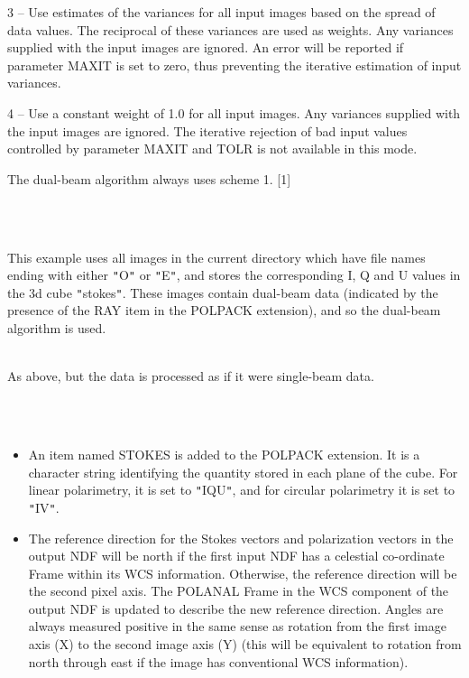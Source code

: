 \documentclass[twoside,11pt]{article}
\renewcommand{\_}{\texttt{\symbol{95}}}
\newlength{\sstexampleslength}
\newcommand{\sstexamples}[1]{
   \item[Examples:] \mbox{} \\
   \vspace{-3.5ex}
   \begin{description}
      #1
   \end{description}
}
\newcommand{\sstexamplesubsection}[2]{\sloppy
\item[\parbox{\sstexampleslength}{\ssttt #1}] \mbox{} \vspace{1.0ex}
\\ #2 }
\newcommand{\sstnotes}[1]{\item[Notes:] \mbox{} \\[1.3ex] #1}
\newcommand{\sstitemlist}[1]{
  \mbox{} \\
  \vspace{-3.5ex}
  \begin{itemize}
     #1
  \end{itemize}
}
\newcommand{\sstitem}{\item}
\newcommand{\sstexamples}[1]{
      \item[Examples:] \\
      \begin{description}
         #1
      \end{description}
      \\
   }
\newcommand{\sstexamplesubsection}[2]{\item[{\ssttt #1}] #2}
\newcommand{\sstnotes}[1]{\item[Notes:] #1 }
\newcommand{\sstitemlist}[1]{
      \begin{itemize}
         #1
      \end{itemize}
      \\
   }
\newcommand{\sstitem}{\item}
\begin{document}
{{{{            \sstitem
            3 -- Use estimates of the variances for all input images based
            on the spread of data values. The reciprocal of these variances
            are used as weights. Any variances supplied with the input images
            are ignored. An error will be reported if parameter MAXIT is set to
            zero, thus preventing the iterative estimation of input variances.

            \sstitem
            4 -- Use a constant weight of 1.0 for all input images. Any
            variances supplied with the input images are ignored. The
            iterative rejection of bad input values controlled by parameter
            MAXIT and TOLR is not available in this mode.

         }
         The dual-beam algorithm always uses scheme 1. [1]
      }
   }
   \sstexamples{
      \sstexamplesubsection{
         polcal {\tt "}$*$\_O,$*$\_E{\tt "} stokes
      }{
         This example uses all images in the current directory which have
         file names ending with either {\tt "}\_O{\tt "} or {\tt "}\_E{\tt "}, and stores the
         corresponding I, Q and U values in the 3d cube {\tt "}stokes{\tt "}. These
         images contain dual-beam data (indicated by the presence of the
         RAY item in the POLPACK extension), and so the dual-beam
         algorithm is used.
      }
      \sstexamplesubsection{
         polcal {\tt "}$*$\_O,$*$\_E{\tt "} stokes nodualbeam
      }{
         As above, but the data is processed as if it were single-beam data.
      }
   }
   \sstnotes{
      \sstitemlist{

         \sstitem
         An item named STOKES is added to the POLPACK extension. It is a
         character string identifying the quantity stored in each plane of
         the cube. For linear polarimetry, it is set to {\tt "}IQU{\tt "}, and for
         circular polarimetry it is set to {\tt "}IV{\tt "}.

         \sstitem
         The reference direction for the Stokes vectors and polarization
         vectors in the output NDF will be north if the first input NDF
         has a celestial co-ordinate Frame within its WCS information. Otherwise,
         the reference direction will be the second pixel axis. The POLANAL
         Frame in the WCS component of the output NDF is updated to describe
         the new reference direction. Angles are always measured positive in the
         same sense as rotation from the first image axis (X) to the second image
         axis (Y) (this will be equivalent to rotation from north through
         east if the image has conventional WCS information).

}}}
\end{document}
